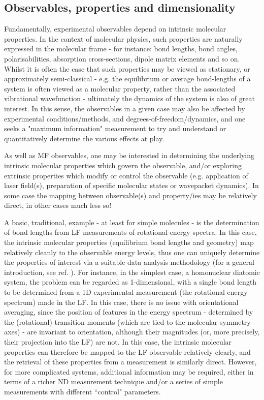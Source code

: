 \subsection{Observables, properties and dimensionality}

Fundamentally, experimental observables depend on intrinsic molecular properties. In the  context of molecular physics, such properties are naturally expressed in the molecular frame - for instance: bond lengths, bond angles, polarisabilities, absorption cross-sections, dipole matrix elements and so on. Whilst it is often the case that such properties may be viewed as stationary, or approximately semi-classical - e.g. the equilibrium or average bond-lengths of a system is often viewed as a molecular property, rather than the associated vibrational wavefunction - ultimately the dynamics of the system is also of great interest. In this sense, the observables in a given case may also be affected by experimental conditions/methods, and degrees-of-freedom/dynamics, and one seeks a "maximum information" measurement to try and understand or quantitatively determine the various effects at play.

As well as MF observables, one may be interested in determining the underlying intrinsic molecular properties which govern the observable, and/or exploring extrinsic properties which modify or control the observable (e.g. application of laser field(s), preparation of specific molecular states or wavepacket dynamics). In some case the mapping between observable(s) and property/ies may be relatively direct, in other cases much less so!

A basic, traditional, example - at least for simple molecules - is the determination of bond lengths from LF measurements of rotational energy spectra. In this case, the intrinsic molecular properties (equilibrium bond lengths and geometry) map relatively cleanly to the observable energy levels, thus one can uniquely determine the properties of interest via a suitable data analysis methodology (for a general introduction, see ref. \cite{hollasHighRes}). For instance, in the simplest case, a homonuclear diatomic system, the problem can be regarded as 1-dimensional, with a single bond length to be determined from a 1D experimental measurement (the rotational energy spectrum) made in the LF. In this case, there is no issue with orientational averaging, since the position of features in the energy spectrum - determined by the (rotational) transition moments (which are tied to the molecular symmetry axes) - are invariant to orientation, although their magnitudes (or, more precisely, their projection into the LF) are not. In this case, the intrinsic molecular properties can therefore be mapped to the LF observable relatively clearly, and the retrieval of these properties from a measurement is similarly direct. However, for more complicated systems, additional information may be required, either in terms of a richer ND measurement technique and/or a series of simple measurements with different ``control" parameters.


